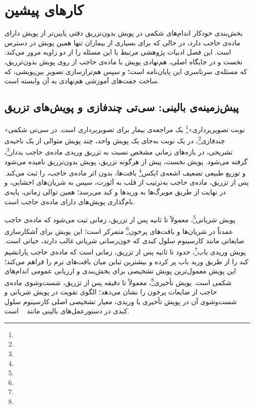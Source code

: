 
\chapter{کارهای پیشین}
\label{chap:literature}

بخش‌بندی خودکار اندام‌های شکمی در پویش بدون‌تزریق دقتی پایین‌تر از پویش دارای ماده‌ی حاجب دارد، در حالی که برای بسیاری از بیماران تنها همین پویش در دسترس است. این فصل ادبیات پژوهشی مرتبط با این مسئله را از دو زاویه مرور می‌کند: نخست و در جایگاه اصلی، هم‌نهادی پویش با ماده‌ی حاجب از روی پویش بدون‌تزریق، که مسئله‌ی سرتاسری این پایان‌نامه است؛ و سپس هم‌ترازسازی تصویر بین‌پویشی، که ساخت جفت‌های آموزشی هم‌نهادی به آن وابسته است.


\section{پیش‌زمینه‌ی بالینی: سی‌تی چندفازی و پویش‌های تزریق}
\label{sec:clinical-background}

«نوبت تصویربرداری»\footnote{} یک مراجعه‌ی بیمار برای تصویربرداری است. در سی‌تی شکمی چندفازی\footnote{}، در یک نوبت به‌جای یک پویش واحد، چند پویش متوالی از یک ناحیه‌ی تشریحی، در بازه‌های زمانی مشخص نسبت به تزریق وریدی ماده‌ی حاجب یددار\footnote{}، گرفته می‌شود. پویش نخست، پیش از هرگونه تزریق، پویش بدون‌تزریق نامیده می‌شود و توزیع طبیعی تضعیف اشعه‌ی ایکس\footnote{} بافت‌ها، بدون اثر ماده‌ی حاجب، را ثبت می‌کند. پس از تزریق، ماده‌ی حاجب به‌ترتیب از قلب به آئورت، سپس به شریان‌های احشایی، و در نهایت از طریق مویرگ‌ها به وریدها و کبد می‌رسد؛ همین توالی زمانی، پایه‌ی نام‌گذاری پویش‌های دارای ماده‌ی حاجب است.

پویش شریانی\footnote{}، معمولاً  تا  ثانیه پس از تزریق، زمانی ثبت می‌شود که ماده‌ی حاجب عمدتاً در شریان‌ها و بافت‌های پرخون\footnote{} متمرکز است؛ این پویش برای آشکارسازی ضایعاتی مانند کارسینوم سلول کبدی که خون‌رسانی شریانی غالب دارند، حیاتی است. پویش وریدی باب\footnote{}، حدود  تا  ثانیه پس از تزریق، زمانی است که ماده‌ی حاجب پارانشیم کبد را از طریق ورید باب پر کرده و بیشترین تباین میان بافت‌های نرم را فراهم می‌کند؛ این پویش معمول‌ترین پویش تشخیصی برای بخش‌بندی و ارزیابی عمومی اندام‌های شکمی است. پویش تأخیری\footnote{}، معمولاً  تا  دقیقه پس از تزریق، شست‌وشوی ماده‌ی حاجب از ضایعات پرخون را نشان می‌دهد؛ الگوی تقویت در پویش شریانی و شست‌وشوی آن در پویش تأخیری یا وریدی، معیار تشخیصی اصلی کارسینوم سلول کبدی در دستورعمل‌های بالینی مانند ~\cite{easl2018} است.


